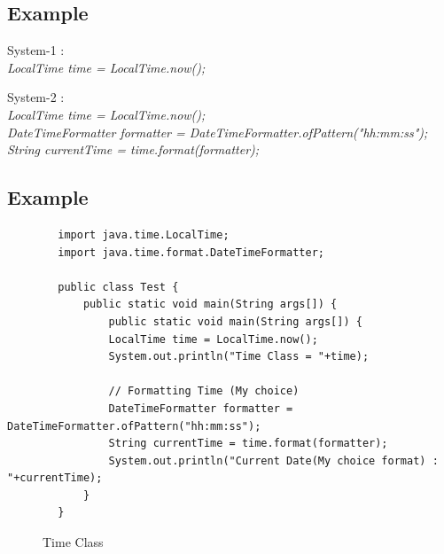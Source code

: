 \documentclass[openany]{book}  %
\begin{document}
\subsection{Example}
\begin{center}
    \tt{
        \raggedright{System-1 :}\\
        \textit{
            LocalTime time = LocalTime.now();\\
        }
        \vskip 0.5cm
        \raggedright{System-2 :}\\
        \textit{
            LocalTime time = LocalTime.now();\\
            DateTimeFormatter formatter = DateTimeFormatter.ofPattern("hh:mm:ss");\\
            String currentTime = time.format(formatter);\\
        }
    }
\end{center}

\newpage

% 
% 
\subsection{Example}
\begin{center}
    \begin{verbatim}
        import java.time.LocalTime;
        import java.time.format.DateTimeFormatter;

        public class Test {
            public static void main(String args[]) {
                public static void main(String args[]) {
                LocalTime time = LocalTime.now();
                System.out.println("Time Class = "+time);

                // Formatting Time (My choice)
                DateTimeFormatter formatter = DateTimeFormatter.ofPattern("hh:mm:ss");
                String currentTime = time.format(formatter);
                System.out.println("Current Date(My choice format) : "+currentTime);
            }
        }
    \end{verbatim}
\end{center}
% 
% 
\begin{figure}[htbp]
    \begin{center}
        \caption{Time Class}
    \end{center}
\end{figure}
% 
% 
\end{document}
